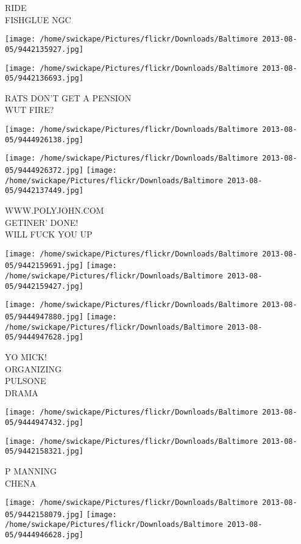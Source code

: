 \documentclass[10pt,letterpaper]{article}
\begin{document}
RIDE\\
FISHGLUE NGC
\pagebreak

\texttt{[image: /home/swickape/Pictures/flickr/Downloads/Baltimore 2013-08-05/9442135927.jpg]}

\vspace{0.25in}
\texttt{[image: /home/swickape/Pictures/flickr/Downloads/Baltimore 2013-08-05/9442136693.jpg]}

RATS DON'T GET A PENSION\\
WUT FIRE?
\pagebreak

\texttt{[image: /home/swickape/Pictures/flickr/Downloads/Baltimore 2013-08-05/9444926138.jpg]}

\vspace{0.25in}
\texttt{[image: /home/swickape/Pictures/flickr/Downloads/Baltimore 2013-08-05/9444926372.jpg]}
\texttt{[image: /home/swickape/Pictures/flickr/Downloads/Baltimore 2013-08-05/9442137449.jpg]}

WWW.POLYJOHN.COM\\
GETINER' DONE!\\
WILL FUCK YOU UP
\pagebreak

\texttt{[image: /home/swickape/Pictures/flickr/Downloads/Baltimore 2013-08-05/9442159691.jpg]}
\texttt{[image: /home/swickape/Pictures/flickr/Downloads/Baltimore 2013-08-05/9442159427.jpg]}

\texttt{[image: /home/swickape/Pictures/flickr/Downloads/Baltimore 2013-08-05/9444947880.jpg]}
\texttt{[image: /home/swickape/Pictures/flickr/Downloads/Baltimore 2013-08-05/9444947628.jpg]}

YO MICK!\\
ORGANIZING\\
PULSONE\\
DRAMA
\pagebreak

\texttt{[image: /home/swickape/Pictures/flickr/Downloads/Baltimore 2013-08-05/9444947432.jpg]}

\vspace{0.25in}
\texttt{[image: /home/swickape/Pictures/flickr/Downloads/Baltimore 2013-08-05/9442158321.jpg]}

P MANNING\\
CHENA
\pagebreak

\texttt{[image: /home/swickape/Pictures/flickr/Downloads/Baltimore 2013-08-05/9442158079.jpg]}
\texttt{[image: /home/swickape/Pictures/flickr/Downloads/Baltimore 2013-08-05/9444946628.jpg]}
\end{document}
